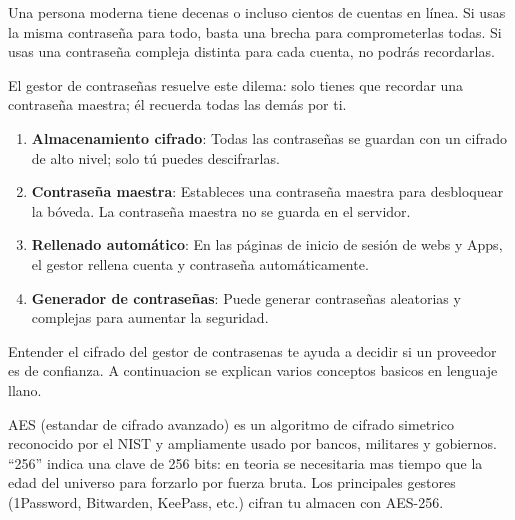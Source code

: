 


Una persona moderna tiene decenas o incluso cientos de cuentas en línea. Si usas la misma contraseña para todo, basta una brecha para comprometerlas todas. Si usas una contraseña compleja distinta para cada cuenta, no podrás recordarlas.

El gestor de contraseñas resuelve este dilema: solo tienes que recordar una contraseña maestra; él recuerda todas las demás por ti.


\begin{enumerate}
  \item \textbf{Almacenamiento cifrado}: Todas las contraseñas se guardan con un cifrado de alto nivel; solo tú puedes descifrarlas.
  \item \textbf{Contraseña maestra}: Estableces una contraseña maestra para desbloquear la bóveda. La contraseña maestra no se guarda en el servidor.
  \item \textbf{Rellenado automático}: En las páginas de inicio de sesión de webs y Apps, el gestor rellena cuenta y contraseña automáticamente.
  \item \textbf{Generador de contraseñas}: Puede generar contraseñas aleatorias y complejas para aumentar la seguridad.
\end{enumerate}


Entender el cifrado del gestor de contrasenas te ayuda a decidir si un proveedor es de confianza. A continuacion se explican varios conceptos basicos en lenguaje llano.


AES (estandar de cifrado avanzado) es un algoritmo de cifrado simetrico reconocido por el NIST y ampliamente usado por bancos, militares y gobiernos. “256” indica una clave de 256 bits: en teoria se necesitaria mas tiempo que la edad del universo para forzarlo por fuerza bruta. Los principales gestores (1Password, Bitwarden, KeePass, etc.) cifran tu almacen con AES-256.

